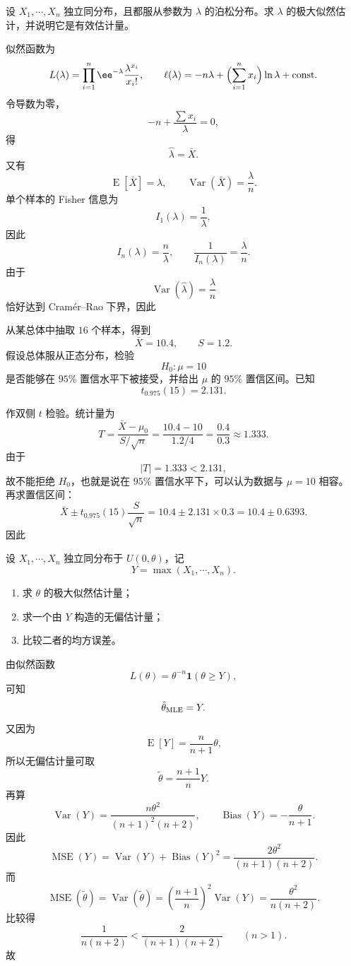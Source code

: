 \begin{question}
设 $X_1,\cdots,X_n$ 独立同分布，且都服从参数为 $\lambda$ 的泊松分布。求 $\lambda$ 的极大似然估计，并说明它是有效估计量。
\begin{solution}
似然函数为
\[
L(\lambda)=\prod_{i=1}^n \ee^{-\lambda}\frac{\lambda^{x_i}}{x_i!},
\qquad
\ell(\lambda)=-n\lambda+\Bigl(\sum_{i=1}^n x_i\Bigr)\ln\lambda+\text{const}.
\]
令导数为零，
\[
-n+\frac{\sum x_i}{\lambda}=0,
\]
得
\[
\hat\lambda=\bar X.
\]
又有
\[
\operatorname{E}[\bar X]=\lambda,\qquad \operatorname{Var}(\bar X)=\frac{\lambda}{n}.
\]
单个样本的 Fisher 信息为
\[
I_1(\lambda)=\frac{1}{\lambda},
\]
因此
\[
I_n(\lambda)=\frac{n}{\lambda},
\qquad
\frac{1}{I_n(\lambda)}=\frac{\lambda}{n}.
\]
由于
\[
\operatorname{Var}(\hat\lambda)=\frac{\lambda}{n}
\]
恰好达到 Cram\'er--Rao 下界，因此
\end{solution}
\end{question}

\begin{question}
从某总体中抽取 $16$ 个样本，得到
\[
\bar X=10.4,\qquad S=1.2.
\]
假设总体服从正态分布，检验
\[
H_0:\mu=10
\]
是否能够在 $95\%$ 置信水平下被接受，并给出 $\mu$ 的 $95\%$ 置信区间。已知
\[
t_{0.975}(15)=2.131.
\]
\begin{solution}
作双侧 $t$ 检验。统计量为
\[
T=\frac{\bar X-\mu_0}{S/\sqrt{n}}
=\frac{10.4-10}{1.2/4}
=\frac{0.4}{0.3}
\approx 1.333.
\]
由于
\[
|T|=1.333<2.131,
\]
故不能拒绝 $H_0$，也就是说在 $95\%$ 置信水平下，可以认为数据与 $\mu=10$ 相容。
再求置信区间：
\[
\bar X\pm t_{0.975}(15)\frac{S}{\sqrt{n}}
=10.4\pm 2.131\times 0.3
=10.4\pm 0.6393.
\]
因此
\end{solution}
\end{question}

\begin{question}
设 $X_1,\cdots,X_n$ 独立同分布于 $U(0,\theta)$，记
\[
Y=\max(X_1,\cdots,X_n).
\]
\begin{enumerate}[label=(\alph*),leftmargin=2.8em,itemsep=0.2em]
\item 求 $\theta$ 的极大似然估计量；
\item 求一个由 $Y$ 构造的无偏估计量；
\item 比较二者的均方误差。
\end{enumerate}
\begin{solution}
由似然函数
\[
L(\theta)=\theta^{-n}\mathbf 1(\theta\ge Y),
\]
可知
\[
\hat\theta_{\rm MLE}=Y.
\]
又因为
\[
\operatorname{E}[Y]=\frac{n}{n+1}\theta,
\]
所以无偏估计量可取
\[
\tilde\theta=\frac{n+1}{n}Y.
\]
再算
\[
\operatorname{Var}(Y)=\frac{n\theta^2}{(n+1)^2(n+2)},
\qquad
\operatorname{Bias}(Y)=-\frac{\theta}{n+1}.
\]
因此
\[
\operatorname{MSE}(Y)=\operatorname{Var}(Y)+\operatorname{Bias}(Y)^2
=\frac{2\theta^2}{(n+1)(n+2)}.
\]
而
\[
\operatorname{MSE}(\tilde\theta)=\operatorname{Var}(\tilde\theta)
=\left(\frac{n+1}{n}\right)^2\operatorname{Var}(Y)
=\frac{\theta^2}{n(n+2)}.
\]
比较得
\[
\frac{1}{n(n+2)}<\frac{2}{(n+1)(n+2)}\qquad (n>1).
\]
故
\end{solution}
\end{question}

